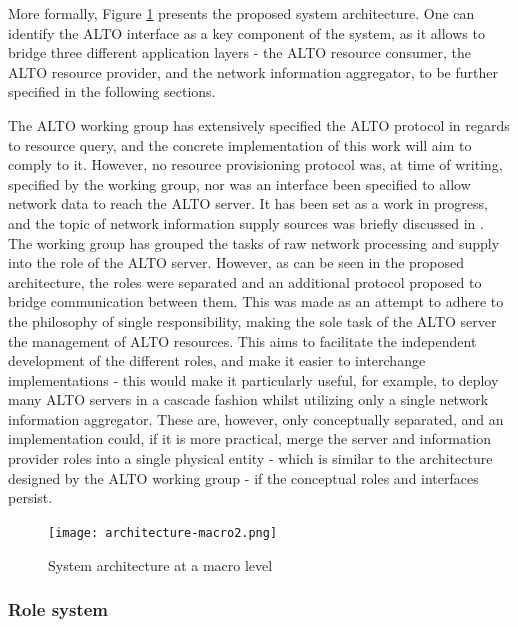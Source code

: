     More formally, Figure \ref{fig:macro-architecture} presents the proposed system architecture.
    One can identify the ALTO interface as a key component of the system, as it allows to bridge three different application layers - the ALTO resource consumer, the ALTO resource provider, and the network information aggregator, to be further specified in the following sections.

    The ALTO working group has extensively specified the ALTO protocol in regards to resource query, and the concrete implementation of this work will aim to comply to it.
    However, no resource provisioning protocol was, at time of writing, specified by the working group, nor was an interface been specified to allow network data to reach the ALTO server.
    It has been set as a work in progress, and the topic of network information supply sources was briefly discussed in \cite{alto-deployment-considerations}.
    The working group has grouped the tasks of raw network processing and supply into the role of the ALTO server.
    However, as can be seen in the proposed architecture, the roles were separated and an additional protocol proposed to bridge communication between them.
    This was made as an attempt to adhere to the philosophy of single responsibility, making the sole task of the ALTO server the management of ALTO resources.
    This aims to facilitate the independent development of the different roles, and make it easier to interchange implementations - this would make it particularly useful, for example, to deploy many ALTO servers in a cascade fashion whilst utilizing only a single network information aggregator.
    These are, however, only conceptually separated, and an implementation could, if it is more practical, merge the server and information provider roles into a single physical entity - which is similar to the architecture designed by the ALTO working group - if the conceptual roles and interfaces persist.

\begin{figure}[!h]
        \centering
        \texttt{[image: architecture-macro2.png]}
        \caption{System architecture at a macro level}
        \label{fig:macro-architecture}
\end{figure}

\subsubsection{Role system}
\label{sssec:system-roles}

